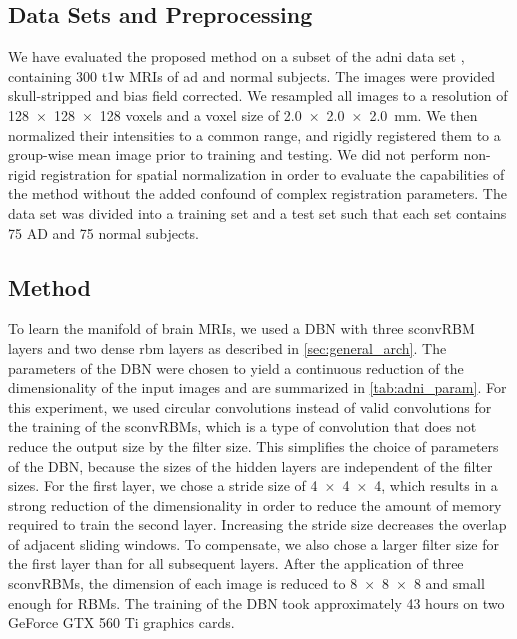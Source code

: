 \subsection[Data sets and preprocessing]{Data Sets and Preprocessing}

We have evaluated the proposed method on a subset of the \gls{adni} data set
\citep{petersen2010}, containing 300 \gls{t1w} MRIs of \gls{ad} and normal
subjects. The images were provided skull-stripped and bias field corrected. We
resampled all images to a resolution of \num{128x128x128} voxels and a voxel
size of \SI{2.0x2.0x2.0}{\milli\meter}. We then normalized their intensities to
a common range, and rigidly registered them to a group-wise mean image prior to
training and testing. We did not perform non-rigid registration for spatial
normalization in order to evaluate the capabilities of the method without the
added confound of complex registration parameters. The data set was divided into
a training set and a test set such that each set contains 75 AD and 75 normal
subjects.

\subsection{Method}

To learn the manifold of brain MRIs, we used a DBN with three sconvRBM layers
and two dense \gls{rbm} layers as described in \ref{sec:general_arch}. The
parameters of the DBN were chosen to yield a continuous reduction of the
dimensionality of the input images and are summarized in \ref{tab:adni_param}.
For this experiment, we used circular convolutions instead of valid convolutions
for the training of the sconvRBMs, which is a type of convolution that does not
reduce the output size by the filter size. This simplifies the choice of
parameters of the DBN, because the sizes of the hidden layers are independent of
the filter sizes. For the first layer, we chose a stride size of \num{4x4x4},
which results in a strong reduction of the dimensionality in order to reduce the
amount of memory required to train the second layer. Increasing the stride size
decreases the overlap of adjacent sliding windows. To compensate, we also chose
a larger filter size for the first layer than for all subsequent layers. After
the application of three sconvRBMs, the dimension of each image is reduced to
\num{8x8x8} and small enough for RBMs. The training of the DBN took
approximately 43 hours on two GeForce GTX 560 Ti graphics cards.


